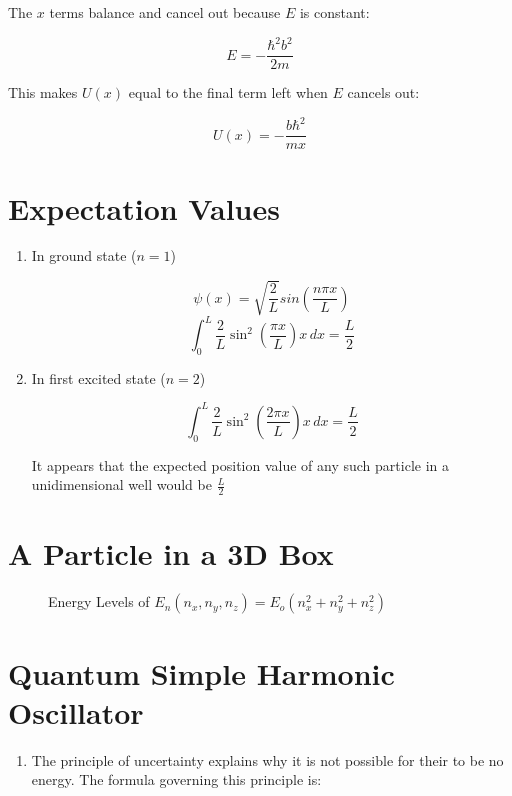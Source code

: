 \begin{enumerate}
    The $x$ terms balance and cancel out because $E$ is constant:

    $$E=-\dfrac{\hbar^2b^2}{2m}$$

    This makes $U(x)$ equal to the final term left when $E$ cancels out:

    $$U(x)=-\dfrac{b\hbar^2}{mx}$$

    \section*{Expectation Values}

    \begin{enumerate}

      \item In ground state ($n=1$)

        $$\psi(x)=\sqrt{\dfrac{2}{L}}sin\left( \dfrac{n\pi x}{L} \right)$$
        $$\int_0^L \dfrac{2}{L}\sin^2\left( \dfrac{\pi x}{L} \right) x\,dx=\frac{L}{2}$$

      \item In first excited state ($n=2$)

        $$\int_0^L \dfrac{2}{L}\sin^2\left( \dfrac{2\pi x}{L} \right) x\,dx=\frac{L}{2}$$

        It appears that the expected position value of any such particle in a unidimensional well would be $\frac{L}{2}$

    \end{enumerate}

    \newpage

    \section*{A Particle in a 3D Box}

    \begin{figure}[h!]
      \centering
      
      \caption{Energy Levels of $E_n(n_x,n_y,n_z)=E_o(n_x^2+n_y^2+n_z^2)$}
      \label{fig:1}
    \end{figure}

    \section*{Quantum Simple Harmonic Oscillator}

    \begin{enumerate}

      \item The principle of uncertainty explains why it is not possible for their to be no energy. The formula governing this principle is:


\end{enumerate}
\end{enumerate}
